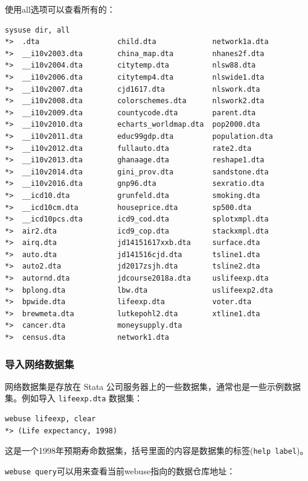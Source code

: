\documentclass[]{ctexbook}
\begin{document}
使用all选项可以查看所有的：

\begin{lstlisting}
sysuse dir, all
*>  .dta                  child.dta             network1a.dta
*>  __i10v2003.dta        china_map.dta         nhanes2f.dta
*>  __i10v2004.dta        citytemp.dta          nlsw88.dta
*>  __i10v2006.dta        citytemp4.dta         nlswide1.dta
*>  __i10v2007.dta        cjd1617.dta           nlswork.dta
*>  __i10v2008.dta        colorschemes.dta      nlswork2.dta
*>  __i10v2009.dta        countycode.dta        parent.dta
*>  __i10v2010.dta        echarts_worldmap.dta  pop2000.dta
*>  __i10v2011.dta        educ99gdp.dta         population.dta
*>  __i10v2012.dta        fullauto.dta          rate2.dta
*>  __i10v2013.dta        ghanaage.dta          reshape1.dta
*>  __i10v2014.dta        gini_prov.dta         sandstone.dta
*>  __i10v2016.dta        gnp96.dta             sexratio.dta
*>  __icd10.dta           grunfeld.dta          smoking.dta
*>  __icd10cm.dta         houseprice.dta        sp500.dta
*>  __icd10pcs.dta        icd9_cod.dta          splotxmpl.dta
*>  air2.dta              icd9_cop.dta          stackxmpl.dta
*>  airq.dta              jd14151617xxb.dta     surface.dta
*>  auto.dta              jd141516cjd.dta       tsline1.dta
*>  auto2.dta             jd2017zsjh.dta        tsline2.dta
*>  autornd.dta           jdcourse2018a.dta     uslifeexp.dta
*>  bplong.dta            lbw.dta               uslifeexp2.dta
*>  bpwide.dta            lifeexp.dta           voter.dta
*>  brewmeta.dta          lutkepohl2.dta        xtline1.dta
*>  cancer.dta            moneysupply.dta
*>  census.dta            network1.dta
\end{lstlisting}

\hypertarget{section-13}{%
\subsubsection{导入网络数据集}\label{section-13}}

网络数据集是存放在 Stata 公司服务器上的一些数据集，通常也是一些示例数据集。例如导入 \texttt{lifeexp.dta} 数据集：

\begin{lstlisting}
webuse lifeexp, clear
*> (Life expectancy, 1998)
\end{lstlisting}

这是一个1998年预期寿命数据集，括号里面的内容是数据集的标签(\texttt{help\ label})。

\texttt{webuse\ query}可以用来查看当前webuse指向的数据仓库地址：
\end{document}

